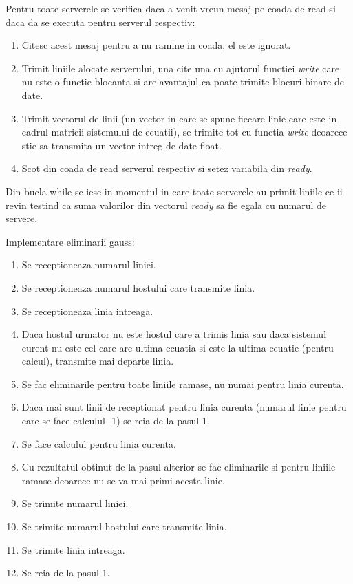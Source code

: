 \documentclass [12pt]{report}
\begin{document}
Pentru toate serverele se verifica daca a venit vreun mesaj pe coada de read
si daca da se executa pentru serverul respectiv:
\begin{enumerate}
\item Citesc acest mesaj pentru a nu ramine in coada, el este ignorat.
\item Trimit liniile alocate serverului, una cite una cu ajutorul functiei
{\it write} care nu este o functie blocanta si are avantajul ca poate
trimite blocuri binare de date.
\item Trimit vectorul de linii (un vector in care se spune fiecare linie
care este in cadrul  matricii sistemului de ecuatii), se trimite tot cu
functia {\it write} deoarece stie sa transmita un vector intreg de date
float.
\item Scot din coada de read serverul respectiv si setez variabila din {\it
ready}.
\end{enumerate}

Din bucla while se iese in momentul in care toate serverele au primit liniile 
ce ii revin testind ca suma valorilor din vectorul {\it ready} sa fie egala
cu numarul de servere.

\pagebreak
Implementare eliminarii gauss:
\begin{enumerate}
\item Se receptioneaza numarul liniei.
\item Se receptioneaza numarul hostului care transmite linia.
\item Se receptioneaza linia intreaga.
\item Daca hostul urmator nu este hostul care a trimis linia sau daca
sistemul curent nu este cel care are ultima ecuatia si este la ultima
ecuatie (pentru calcul), transmite mai departe linia.
\item Se fac eliminarile pentru toate liniile ramase, nu numai pentru linia
curenta.
\item Daca mai sunt linii de receptionat pentru linia curenta (numarul linie
pentru care se face calculul -1) se reia de la pasul 1.
\item Se face calculul pentru linia curenta.
\item Cu rezultatul obtinut de la pasul alterior se fac eliminarile si
pentru liniile ramase deoarece nu se va mai primi acesta linie.
\item Se trimite numarul liniei.
\item Se trimite numarul hostului care transmite linia.
\item Se trimite linia intreaga.
\item Se reia de la pasul 1.
\end{enumerate}
\end{document}
